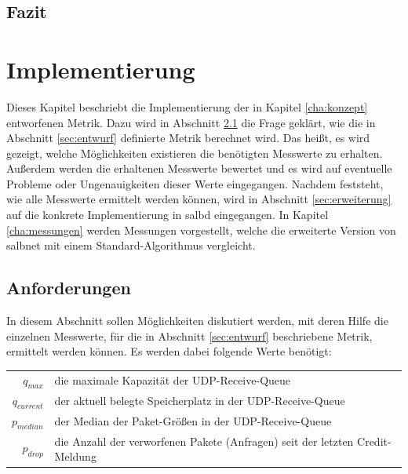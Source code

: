\documentclass[a4paper, 12pt, BCOR10mm, DIV12, toc=bibliography, toc=listof, german]{scrbook}
\begin{document}

		\section{Fazit} %
		\label{sec:konzept-fazit}
		


	\chapter{Implementierung} %
	\label{cha:implementierung}


	Dieses Kapitel beschriebt die Implementierung der in Kapitel \ref{cha:konzept} entworfenen Metrik.
	Dazu wird in Abschnitt \ref{sec:anforderungen} die Frage geklärt, wie die in Abschnitt
	\ref{sec:entwurf} definierte Metrik berechnet wird. Das heißt, es wird gezeigt, welche
	Möglichkeiten existieren die benötigten Messwerte zu erhalten. Außerdem werden die erhaltenen
	Messwerte bewertet und es wird auf eventuelle Probleme oder Ungenauigkeiten dieser Werte
	eingegangen. Nachdem feststeht, wie alle Messwerte ermittelt werden können, wird in Abschnitt
	\ref{sec:erweiterung} auf die konkrete Implementierung in salbd eingegangen. In Kapitel
	\ref{cha:messungen} werden Messungen vorgestellt, welche die erweiterte Version von salbnet mit
	einem Standard-Algorithmus vergleicht.
		
		\section{Anforderungen} %
		\label{sec:anforderungen}

		In diesem Abschnitt sollen Möglichkeiten diskutiert werden, mit deren Hilfe die einzelnen
		Messwerte, für die in Abschnitt \ref{sec:entwurf} beschriebene Metrik, ermittelt werden können. Es
		werden dabei folgende Werte benötigt: $~$\\
		
		\begin{tabular}{rl}
			$q_{max}$		  & die maximale Kapazität der UDP-Receive-Queue\\
			$q_{current}$ &	der aktuell belegte Speicherplatz in der UDP-Receive-Queue\\
			$p_{median}$  &	der Median der Paket-Größen in der UDP-Receive-Queue\\
			$p_{drop}$    &	die Anzahl der verworfenen Pakete (Anfragen) seit der letzten Credit-Meldung\\
		\end{tabular}
\end{document}
